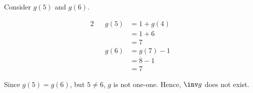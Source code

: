 \documentclass{jhwhw}
\begin{document}

            \subpart
                Consider $g(5)$ and $g(6)$.

                \begin{alignat*}{2}
                    && g(5) &= 1 + g(4)\\
                    && &= 1 + 6\\
                    && &= 7\\
                    && g(6) &= g(7) - 1\\
                    && &= 8 - 1\\
                    && &= 7
                \end{alignat*}

                Since $g(5) = g(6)$, but $5 \neq 6$, $g$ is not one-one. Hence, $\inv g$ does not exist.

\end{document}
